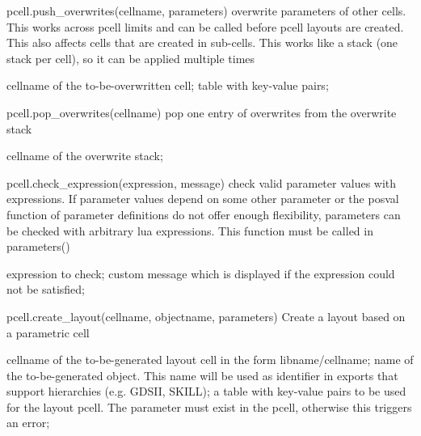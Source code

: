 \begin{APIfunc}{pcell.push\_overwrites(cellname, parameters)}
    overwrite parameters of other cells. This works across pcell limits and can be called before pcell layouts are created. This also affects cells that are created in sub-cells. This works like a stack (one stack per cell), so it can be applied multiple times
    \begin{APIparameters}
            cellname of the to-be-overwritten cell;
            table with key-value pairs;
    \end{APIparameters}
\end{APIfunc}
\begin{APIfunc}{pcell.pop\_overwrites(cellname)}
    pop one entry of overwrites from the overwrite stack
    \begin{APIparameters}
            cellname of the overwrite stack;
    \end{APIparameters}
\end{APIfunc}
\begin{APIfunc}{pcell.check\_expression(expression, message)}
    check valid parameter values with expressions. If parameter values depend on some other parameter or the posval function of parameter definitions do not offer enough flexibility, parameters can be checked with arbitrary lua expressions. This function must be called in parameters()
    \begin{APIparameters}
            expression to check;
            custom message which is displayed if the expression could not be satisfied;
    \end{APIparameters}
\end{APIfunc}
\begin{APIfunc}{pcell.create\_layout(cellname, objectname, parameters)}
    Create a layout based on a parametric cell
    \begin{APIparameters}
            cellname of the to-be-generated layout cell in the form libname/cellname;
            name of the to-be-generated object. This name will be used as identifier in exports that support hierarchies (e.g. GDSII, SKILL);
            a table with key-value pairs to be used for the layout pcell. The parameter must exist in the pcell, otherwise this triggers an error;
    \end{APIparameters}
\end{APIfunc}
